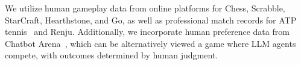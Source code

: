 We utilize human gameplay data from online platforms for Chess, Scrabble, StarCraft, Hearthstone, and Go, as well as professional match records for ATP tennis~\cite{tennis_atp} and Renju. Additionally, we incorporate human preference data from Chatbot Arena~\citep{zheng2023judging}, which can be alternatively viewed a game where LLM agents compete, with outcomes determined by human judgment. 





